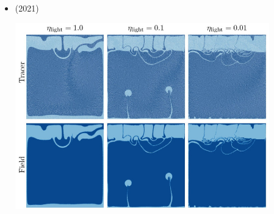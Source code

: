 \begin{itemize}
\item \textcite{simw21} (2021)

\begin{center}
\includegraphics[width=11cm]{images/benchmark_vaks97/simw21}
\end{center}



\end{itemize}

